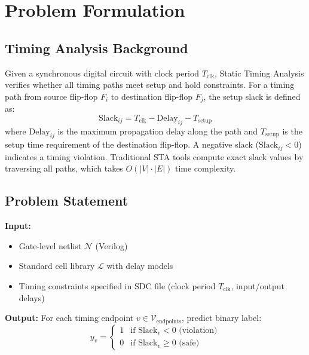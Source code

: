 \documentclass[10pt,twocolumn,journal]{IEEEtran}
\begin{document}
\section{Problem Formulation}
\label{sec:problem}

\subsection{Timing Analysis Background}

Given a synchronous digital circuit with clock period $T_{\text{clk}}$, Static Timing Analysis verifies whether all timing paths meet setup and hold constraints. For a timing path from source flip-flop $F_i$ to destination flip-flop $F_j$, the setup slack is defined as:
\begin{equation}
\text{Slack}_{ij} = T_{\text{clk}} - \text{Delay}_{ij} - T_{\text{setup}}
\label{eq:slack}
\end{equation}
where $\text{Delay}_{ij}$ is the maximum propagation delay along the path and $T_{\text{setup}}$ is the setup time requirement of the destination flip-flop. A negative slack ($\text{Slack}_{ij} < 0$) indicates a timing violation. Traditional STA tools compute exact slack values by traversing all paths, which takes $O(|V| \cdot |E|)$ time complexity.

\subsection{Problem Statement}

\textbf{Input:}
\begin{itemize}
    \item Gate-level netlist $\mathcal{N}$ (Verilog)
    \item Standard cell library $\mathcal{L}$ with delay models
    \item Timing constraints specified in SDC file (clock period $T_{\text{clk}}$, input/output delays)
\end{itemize}

\textbf{Output:}
For each timing endpoint $v \in \mathcal{V}_{\text{endpoints}}$, predict binary label:
\begin{equation}
y_v = \begin{cases}
1 & \text{if } \text{Slack}_v < 0 \text{ (violation)} \\
0 & \text{if } \text{Slack}_v \geq 0 \text{ (safe)}
\end{cases}
\label{eq:label}
\end{equation}
\end{document}
